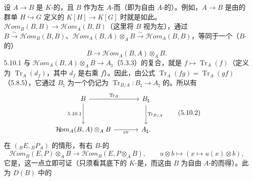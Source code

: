 设 $A\to B$ 是 $K$-的，且 $B$ 作为左 $A$-而（即为自由 $A$-的）。例如，$A\to B$ 是由的群单 $H\hookrightarrow G$ 定义的 $K[H]\to K[G]$ 时就是如此。 $\mathcal{H}\!om_B(B,B)\to\mathcal{H}\!om_A(B,B)$（这里将 $B$ 视为左），通过 $B\xrightarrow\sim\mathcal{H}\!om_B(B,B)$、$\mathcal{H}\!om_A(B,A)\otimes_A B\xrightarrow\sim\mathcal{H}\!om_A(B,B)$，等同于一个（$B$-的）
\begin{equation}B\longrightarrow\mathcal{H}\!om_A(B,A)\otimes_A B.\tag{5.10.1}\end{equation}
5.10.1 与 $\mathcal{H}\!om_A(B,A)\otimes_A B\to A_\natural$（5.3.3）的复合，就是 $f\mapsto\operatorname{Tr}_A(f)$（定义为 $\operatorname{Tr}_A(d_f)$，其中 $d_f$ 是右乘 $f$）。因此，由公式 $\operatorname{Tr}_A(fg)=\operatorname{Tr}_A(gf)$（5.8.5），它通过 $B_\natural$ 为一个仍记为 $\operatorname{Tr}_{B/A}:B_\natural\to A_\natural$ 的。所以有
\begin{equation}\begin{tikzcd}[column sep=large,row sep=large]
B\arrow[r,"\operatorname{Tr}_B"]\arrow[d,"5.10.1"'] & B_\natural\arrow[d,"\operatorname{Tr}_{B/A}"]\\
\mathcal{H}\!om_A(B,A)\otimes_A B\arrow[r,"\mathrm{ev}"'] & A_\natural.
\end{tikzcd}\tag{5.10.2}\end{equation}
在 $({}_BE,{}_BP_A)$ 的情形，有右 $B$-的
\begin{equation}\mathcal{H}\!om_B(E,P)\otimes_A B\longrightarrow\mathcal{H}\!om_B(E,P\otimes_A B),\qquad u\otimes b\longmapsto(x\longmapsto u(x)\otimes b),\tag{5.10.3}\end{equation}
它是，这一点立即可证（只须看其底下的 $K$-是，而这由 $B$ 为自由 $A$-的而得）。此为 $D(B)$ 中的
